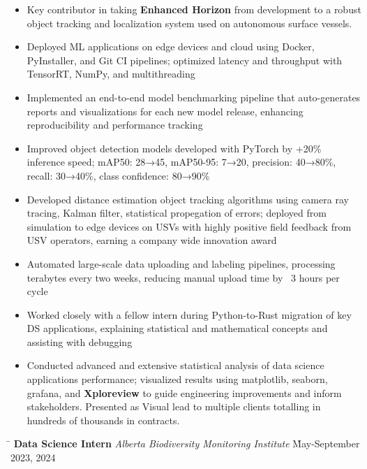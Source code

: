 \documentclass[a4paper,11pt]{article}
\def\locationh{\hspace{7cm}}
\def\subsectionv{\vspace{-5.3ex}}
\def\postpointsv{\vspace{0cm}}
\begin{document}
\begin{itemize}[leftmargin=.5cm, itemsep=.1cm, before=\subsectionv, after=\postpointsv]
    \item Key contributor in taking \textbf{Enhanced Horizon\texttrademark} from development to a robust object tracking and localization system used on autonomous surface vessels.
    \item Deployed ML applications on edge devices and cloud using Docker, PyInstaller, and Git CI pipelines; optimized latency and throughput with TensorRT, NumPy, and multithreading
    \item Implemented an end-to-end model benchmarking pipeline that auto-generates reports and visualizations for each new model release, enhancing reproducibility and performance tracking
    \item Improved object detection models developed with PyTorch by +20\% inference speed; mAP50: 28→45, mAP50-95: 7→20, precision: 40→80\%, recall: 30→40\%, class confidence: 80→90\%
    \item Developed distance estimation object tracking algorithms using camera ray tracing, Kalman filter, statistical propegation of errors; deployed from simulation to edge devices on USVs with highly positive field feedback from USV operators, earning a company wide innovation award
    \item Automated large-scale data uploading and labeling pipelines, processing terabytes every two weeks, reducing manual upload time by ~3 hours per cycle
    \item Worked closely with a fellow intern during Python-to-Rust migration of key DS applications, explaining statistical and mathematical concepts and assisting with debugging
    \item Conducted advanced and extensive statistical analysis of data science applications performance; visualized results using matplotlib, seaborn, grafana, and \textbf{Xploreview\texttrademark} to guide engineering improvements and inform stakeholders. Presented as Visual lead to multiple clients totalling in hundreds of thousands in contracts.
\end{itemize}


\noindent \begin{tabbing}
    \locationh \= \kill
    \textbf{Data Science Intern} \textit{Alberta Biodiversity Monitoring Institute} \` May-September 2023, 2024\\
\end{tabbing}
\end{document}
